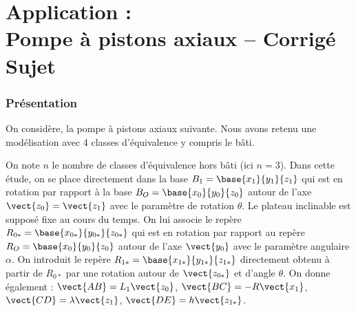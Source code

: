 \chapter*{Application  :\\ 
Pompe à pistons axiaux -- \ifprof Corrigé \else Sujet \fi}

\iflivret {} \else
\ifprof  {} \else \fi
\fi

\setcounter{question}{0}

%



\subsection*{Présentation}
On considère, la pompe à pistons axiaux suivante. Nous avons retenu une modélisation avec 4 classes d'équivalence y compris le bâti.


On note $n$ le nombre de classes d'équivalence hors bâti (ici $n=3$).
Dans cette étude, on se place directement dans la base $B_{1}=\base{{x_{1}}}{{y_{1}}}{{z_{1}}}$ qui est en rotation par rapport à la base $B_{O}=\base{{x_{0}}}{{y_{0}}}{{z_{0}}}$ autour de l'axe $\vect{z_{0}}=\vect{z_{1}}$ avec le paramètre de rotation $\theta$.
Le plateau inclinable est supposé fixe au cours du temps. On lui associe le repère $R_{0*}=\base{{x_{0*}}}{{y_{0*}}}{{z_{0*}}}$ qui est en rotation par rapport au repère $R_{O}=\base{{x_{0}}}{{y_{0}}}{{z_{0}}}$ autour de l'axe $\vect{y_{0}}$ avec le paramètre angulaire $\alpha$. On introduit le repère $R_{1*}=\base{{x_{1*}}}{{y_{1*}}}{{z_{1*}}}$ directement obtenu à partir de $R_{0*}$ par une rotation autour de $\vect{z_{0*}}$ et d'angle $\theta$.
On donne également :
$\vect{AB}=L_1\vect{z_0}$, $\vect{BC}=-R\vect{x_1}$, $\vect{CD}=\lambda\vect{z_1}$, $\vect{DE}=h\vect{z_{1*}}$.


